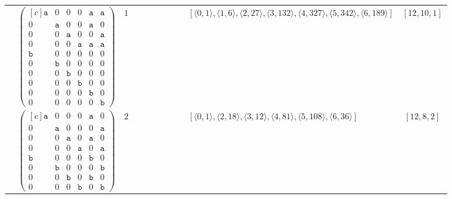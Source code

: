 \documentclass[12pt]{article}
\theoremstyle{definition}
\theoremstyle{plain}
\begin{document}
{\begin{longtable}{@{}cYcccccccZc@{}}
& $\begin{pmatrix*}[c]
\mathtt{a}  &  0  &  0  &  0  &  \mathtt{a}  &  \mathtt{a}  \\
0  &  \mathtt{a}  &  0  &  0  &  \mathtt{a}  &  0  \\
0  &  0  &  \mathtt{a}  &  0  &  0  &  \mathtt{a}  \\
0  &  0  &  0  &  \mathtt{a}  &  \mathtt{a}  &  \mathtt{a}  \\
\mathtt{b}  &  0  &  0  &  0  &  0  &  0  \\
0  &  \mathtt{b}  &  0  &  0  &  0  & 0  \\
0  &  0  &  \mathtt{b}  &  0  &  0  & 0   \\
0  &  0  &  0  &  \mathtt{b}  &  0   &  0  \\
0  &  0  &  0  &  0  &  \mathtt{b}   &  0  \\
0  &  0  &  0  &  0  &  0   &  \mathtt{b}
\end{pmatrix*}$
& $1$
&
&
&
&
&
&
& $[\langle0,1\rangle,\allowbreak\langle1,6\rangle,\allowbreak\langle2,27\rangle,\allowbreak\langle3,132\rangle,\allowbreak\langle4,327\rangle,\allowbreak\langle5,342\rangle,\allowbreak\langle6,189\rangle]$
& $[12,10,1]$     \\

\cmidrule(lr){2-11}


& $\begin{pmatrix*}[c]
\mathtt{a}  &  0  &  0  &  0  &  \mathtt{a}  &  0  \\
0  &  \mathtt{a}  &  0  &  0  &  0  &  \mathtt{a}  \\
0  &  0  &  \mathtt{a}  &  0  &  \mathtt{a}  &  0  \\
0  &  0  &  0  &  \mathtt{a}  &  0  &  \mathtt{a}  \\
\mathtt{b}  &  0  &  0  &  0  &  \mathtt{b}  &  0  \\
0  &  \mathtt{b}  &  0  &  0  &  0  &  \mathtt{b}  \\
0  &  0  &  \mathtt{b}  &  0  &  \mathtt{b}  & 0   \\
0  &  0  &  0  &  \mathtt{b}  &  0   &  \mathtt{b}
\end{pmatrix*}$
& $2$
&
&
&
&
&
&
& $[\langle0,1\rangle,\allowbreak\langle2,18\rangle,\allowbreak\langle3,12\rangle,\allowbreak\langle4,81\rangle,\allowbreak\langle5,108\rangle,\allowbreak\langle6,36\rangle]$
& $[12,8,2]$\\

\cmidrule(lr){2-11}


\end{longtable}}
\end{document}
